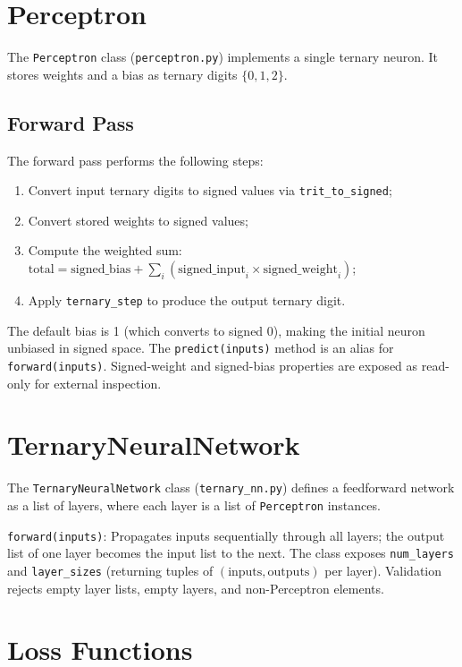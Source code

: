 \documentclass[10pt,a4paper,twoside]{book}
\begin{document}
\section{Perceptron}

The \texttt{Perceptron} class (\texttt{perceptron.py}) implements a single
ternary neuron. It stores weights and a bias as ternary digits
$\{0,1,2\}$.

\subsection{Forward Pass}

The forward pass performs the following steps:
\begin{enumerate}
    \item Convert input ternary digits to signed values via
          \texttt{trit\_to\_signed};
    \item Convert stored weights to signed values;
    \item Compute the weighted sum:
          $\text{total} = \text{signed\_bias} + \sum_i
          (\text{signed\_input}_i \times \text{signed\_weight}_i)$;
    \item Apply \texttt{ternary\_step} to produce the output ternary digit.
\end{enumerate}

The default bias is 1 (which converts to signed 0), making the initial
neuron unbiased in signed space. The \texttt{predict(inputs)} method is
an alias for \texttt{forward(inputs)}. Signed-weight and signed-bias
properties are exposed as read-only for external inspection.

\section{TernaryNeuralNetwork}

The \texttt{TernaryNeuralNetwork} class (\texttt{ternary\_nn.py}) defines
a feedforward network as a list of layers, where each layer is a list of
\texttt{Perceptron} instances.

\noindent\texttt{forward(inputs)}: Propagates inputs sequentially through
all layers; the output list of one layer becomes the input list to the
next. The class exposes \texttt{num\_layers} and
\texttt{layer\_sizes} (returning tuples of $(\text{inputs}, \text{outputs})$
per layer). Validation rejects empty layer lists, empty layers, and
non-Perceptron elements.

\section{Loss Functions}
\end{document}
